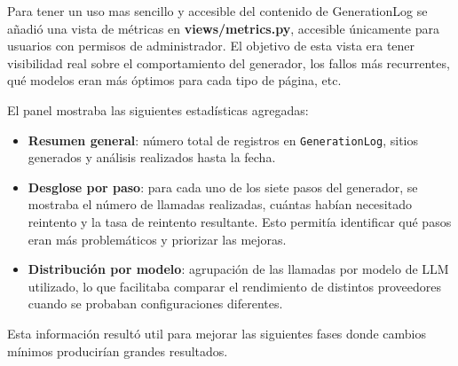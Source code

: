 Para tener un uso mas sencillo y accesible del contenido de GenerationLog se añadió una vista de métricas en \textbf{views/metrics.py}, accesible únicamente para usuarios con permisos de administrador. El objetivo de esta vista era tener visibilidad real sobre el comportamiento del generador, los fallos más recurrentes, qué modelos eran más óptimos para cada tipo de página, etc.

El panel mostraba las siguientes estadísticas agregadas:

\begin{itemize}
    \item \textbf{Resumen general}: número total de registros en \texttt{GenerationLog}, sitios generados y análisis realizados hasta la fecha.
    \item \textbf{Desglose por paso}: para cada uno de los siete pasos del generador, se mostraba el número de llamadas realizadas, cuántas habían necesitado reintento y la tasa de reintento resultante. Esto permitía identificar qué pasos eran más problemáticos y priorizar las mejoras.
    \item \textbf{Distribución por modelo}: agrupación de las llamadas por modelo de LLM utilizado, lo que facilitaba comparar el rendimiento de distintos proveedores cuando se probaban configuraciones diferentes.
\end{itemize}

Esta información resultó util para mejorar las siguientes fases donde cambios mínimos producirían grandes resultados.


